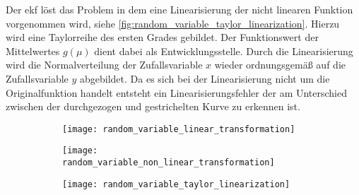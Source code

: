 Der \Gls{ekf} löst das Problem in dem eine Linearisierung der nicht linearen Funktion vorgenommen wird, siehe \autoref{fig:random_variable_taylor_linearization}. Hierzu wird eine Taylorreihe des ersten Grades gebildet. Der Funktionswert der Mittelwertes $g(\mu)$ dient dabei als Entwicklungsstelle. Durch die Linearisierung wird die Normalverteilung der Zufallsvariable $x$ wieder ordnungsgemäß auf die Zufallsvariable $y$ abgebildet. Da es sich bei der Linearisierung nicht um die Originalfunktion handelt entsteht ein Linearisierungsfehler der am Unterschied zwischen der durchgezogen und gestrichelten Kurve zu erkennen ist.

\begin{figure}
	\centering
	\begin{subfigure}{0.49\linewidth}
		\centering
		\texttt{[image: random\_variable\_linear\_transformation]}
		\caption{}
		\label{fig:random_variable_linear_transformation}
	\end{subfigure}
	\hfill
	\begin{subfigure}{0.49\linewidth}
		\centering
		\texttt{[image: random\_variable\_non\_linear\_transformation]}
		\caption{}
		\label{fig:random_variable_non_linear_transformation}
	\end{subfigure}
	\par
	\bigskip
	\begin{subfigure}{0.49\linewidth}
		\centering
		\texttt{[image: random\_variable\_taylor\_linearization]}
		\caption{}
		\label{fig:random_variable_taylor_linearization}
	\end{subfigure}
	\label{fig:random_variable_transformation}
\end{figure}


%
%
\section{}

